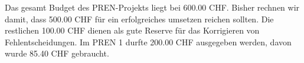 Das gesamt Budget des PREN-Projekts liegt bei 600.00 CHF. Bisher rechnen
wir damit, dass 500.00 CHF für ein erfolgreiches umsetzen reichen sollten.
Die restlichen 100.00 CHF dienen als gute Reserve für das Korrigieren von
Fehlentscheidungen. Im PREN 1 durfte 200.00 CHF ausgegeben werden, davon
wurde 85.40 CHF gebraucht. 








